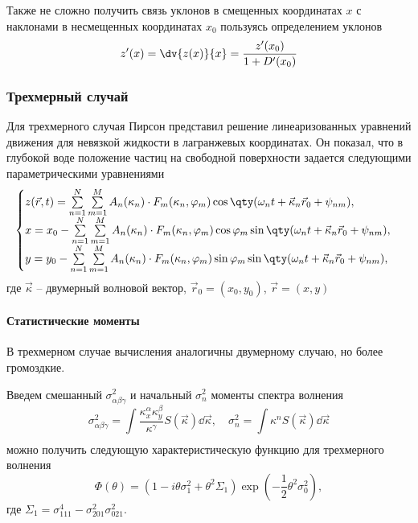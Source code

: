 Также не сложно получить связь уклонов в смещенных координатах $x$ с наклонами
в несмещенных координатах $x_0$ пользуясь определением уклонов
 \begin{equation}
    z'(x) = \dv{z(x)}{x} = \frac{z'(x_0)}{1 + D'(x_0)}
\end{equation}



\subsubsection{Трехмерный случай}%

Для трехмерного случая Пирсон \cite{pierson} представил решение
линеаризованных уравнений движения для невязкой жидкости в лагранжевых
координатах. Он показал, что в глубокой воде положение частиц на свободной поверхности задается следующими параметрическими уравнениями
\begin{equation}
    \begin{cases}
        \label{eq:surface2dcwm}
        z(\vec r,t) = \sum\limits_{n=1}^{N} \sum\limits_{m=1}^{M}
        A_n(\kappa_n) \cdot
        F_m(\kappa_n,\phi_m) \cos \qty(\omega_n t + \vec \kappa_n \vec r_0 +
        \psi_{nm}),    \\
        x = x_0 - \sum\limits_{n=1}^{N} \sum\limits_{m=1}^{M}
        A_n(\kappa_n) \cdot
        F_m(\kappa_n,\phi_m) \cos\phi_m \sin\qty(\omega_n t + \vec \kappa_n \vec r_0 +
        \psi_{nm}),\\
        y = y_{0} - \sum\limits_{n=1}^{N} \sum\limits_{m=1}^{M}
        A_n(\kappa_n) \cdot
        F_m(\kappa_n,\phi_m) \sin \phi_m \sin \qty(\omega_n t + \vec \kappa_n \vec
        r_0 + \psi_{nm}),
    \end{cases}
\end{equation}
где $\vec \kappa$ -- двумерный волновой вектор,  
$\vec r_0 = (x_0, y_0)$, $\vec r = (x, y)$


\paragraph{Статистические моменты}
\label{par:statisticheskie_momenty}
В трехмерном случае вычисления аналогичны двумерному случаю, но более
громоздкие.

Введем смешанный $\sigma_{\alpha \beta \gamma}^2$ и начальный $\sigma_n^2$
моменты спектра волнения \cite{nouguier}
\begin{equation}
    \sigma^2_{\alpha \beta \gamma} =  \int\limits_{} \frac{\kappa_x^\alpha
    \kappa_y^\beta}{\kappa^{\gamma}} S(\vec \kappa) \dd \vec \kappa,\quad
    \sigma_n^2 = \int\limits_{}^{} \kappa^n S(\vec \kappa) \dd \vec \kappa 
\end{equation}
можно получить следующую характеристическую функцию для трехмерного волнения
\begin{equation}
    \label{eq:char}
    \Phi(\theta) = (1 - i \theta \sigma_1^2 + \theta^2 \Sigma_1)
    \exp(-\frac{1}{2} \theta^2 \sigma_0^2),
\end{equation}
где $\Sigma_1 = \sigma^4_{111} - \sigma_{201}^2 \sigma_{021}^2$.

